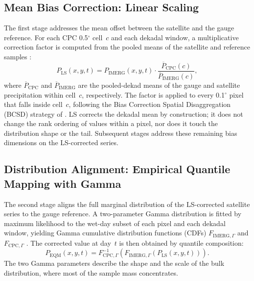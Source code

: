 \subsection{Mean Bias Correction: Linear Scaling}\label{sec:methods-ls}

The first stage addresses the mean offset between the satellite
and the gauge reference. For each CPC 0.5$^{\circ}$ cell~$c$ and
each dekadal window, a multiplicative correction factor is
computed from the pooled means of the satellite and reference
samples \citep{ref:teutschbein2012}:
\begin{equation}
P_{\text{LS}}(x, y, t) =
P_{\text{IMERG}}(x, y, t)
\cdot \frac{\overline{P}_{\text{CPC}}(c)}{\overline{P}_{\text{IMERG}}(c)},
\label{eq:ls}
\end{equation}
where $\overline{P}_{\text{CPC}}$ and $\overline{P}_{\text{IMERG}}$
are the pooled-dekad means of the gauge and satellite precipitation
within cell~$c$, respectively. The factor is applied to every
0.1$^{\circ}$ pixel that falls inside cell~$c$, following the
Bias Correction Spatial Disaggregation (BCSD) strategy of
\citet{ref:wood2004}. LS corrects the dekadal mean by construction;
it does not change the rank ordering of values within a pixel,
nor does it touch the distribution shape or the tail. Subsequent
stages address these remaining bias dimensions on the LS-corrected
series.


\subsection{Distribution Alignment: Empirical Quantile Mapping with Gamma}\label{sec:methods-eqm}

The second stage aligns the full marginal distribution of the
LS-corrected satellite series to the gauge reference. A
two-parameter Gamma distribution is fitted by maximum likelihood
to the wet-day subset of each pixel and each dekadal window,
yielding Gamma cumulative distribution functions (CDFs)
$F_{\text{IMERG},\Gamma}$ and $F_{\text{CPC},\Gamma}$
\citep{ref:gudmundsson2012, ref:themessl2012}. The corrected
value at day~$t$ is then obtained by quantile composition:
\begin{equation}
P_{\text{EQM}}(x, y, t) =
F_{\text{CPC},\Gamma}^{-1}\!
\left(F_{\text{IMERG},\Gamma}\!\left(P_{\text{LS}}(x, y, t)\right)\right).
\label{eq:eqm}
\end{equation}
The two Gamma parameters describe the shape and the scale of the
bulk distribution, where most of the sample mass concentrates.


